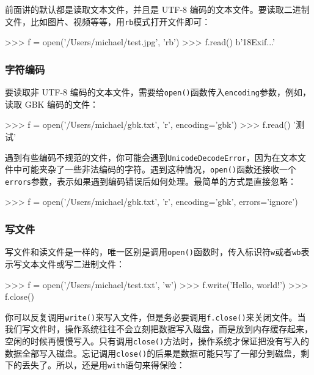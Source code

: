 前面讲的默认都是读取文本文件，并且是 UTF-8
编码的文本文件。要读取二进制文件，比如图片、视频等等，用\texttt{\textquotesingle{}rb\textquotesingle{}}模式打开文件即可：

\begin{pythoncode}
>>> f = open('/Users/michael/test.jpg', 'rb')
>>> f.read()
b'\xff{}\xff{}\x18Exif...' 
\end{pythoncode}

\hypertarget{ux5b57ux7b26ux7f16ux7801}{%
\subsubsection{字符编码}\label{ux5b57ux7b26ux7f16ux7801}}

要读取非 UTF-8
编码的文本文件，需要给\texttt{open()}函数传入\texttt{encoding}参数，例如，读取
GBK 编码的文件：

\begin{pythoncode}
>>> f = open('/Users/michael/gbk.txt', 'r', encoding='gbk')
>>> f.read()
'测试'
\end{pythoncode}

遇到有些编码不规范的文件，你可能会遇到\texttt{UnicodeDecodeError}，因为在文本文件中可能夹杂了一些非法编码的字符。遇到这种情况，\texttt{open()}函数还接收一个\texttt{errors}参数，表示如果遇到编码错误后如何处理。最简单的方式是直接忽略：

\begin{pythoncode}
>>> f = open('/Users/michael/gbk.txt', 'r', encoding='gbk', errors='ignore')
\end{pythoncode}

\hypertarget{ux5199ux6587ux4ef6}{%
\subsubsection{写文件}\label{ux5199ux6587ux4ef6}}

写文件和读文件是一样的，唯一区别是调用\texttt{open()}函数时，传入标识符\texttt{\textquotesingle{}w\textquotesingle{}}或者\texttt{\textquotesingle{}wb\textquotesingle{}}表示写文本文件或写二进制文件：

\begin{pythoncode}
>>> f = open('/Users/michael/test.txt', 'w')
>>> f.write('Hello, world!')
>>> f.close()
\end{pythoncode}

你可以反复调用\texttt{write()}来写入文件，但是务必要调用\texttt{f.close()}来关闭文件。当我们写文件时，操作系统往往不会立刻把数据写入磁盘，而是放到内存缓存起来，空闲的时候再慢慢写入。只有调用\texttt{close()}方法时，操作系统才保证把没有写入的数据全部写入磁盘。忘记调用\texttt{close()}的后果是数据可能只写了一部分到磁盘，剩下的丢失了。所以，还是用\texttt{with}语句来得保险：

